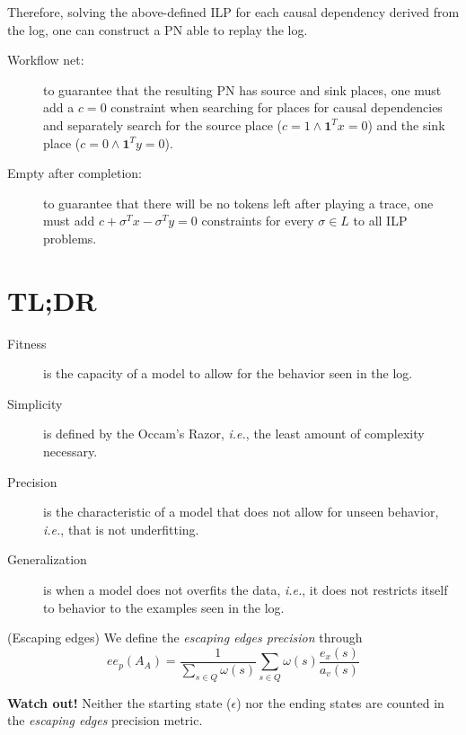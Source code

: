 \documentclass[a4paper]{report}
\begin{document}
Therefore, solving the above-defined ILP for each causal dependency derived from the log, one can construct a PN able to replay the log.

\begin{description}
    \item[Workflow net:] to guarantee that the resulting PN has source and sink places, one must add a $c=0$ constraint when searching for places for causal dependencies and separately search for the source place ($c=1 \land \bm{1}^{T}x=0$) and the sink place ($c=0 \land \bm{1}^{T}y=0$).
    \item[Empty after completion:] to guarantee that there will be no tokens left after playing a trace, one must add $c+\sigma^{T}x - \sigma^{T}y=0$ constraints for every $\sigma \in L$ to all ILP problems.
\end{description}

\section*{TL;DR}

\begin{description}
    \item[Fitness] is the capacity of a model to allow for the behavior seen in the log.
    \item[Simplicity] is defined by the Occam's Razor, \emph{i.e.}, the least amount of complexity necessary.
    \item[Precision] is the characteristic of a model that does not allow for unseen behavior, \emph{i.e.}, that is not underfitting.
    \item[Generalization] is when a model does not overfits the data, \emph{i.e.}, it does not restricts itself to behavior to the examples seen in the log.
\end{description}

\begin{definition}
    (Escaping edges) We define the \emph{escaping edges precision} through \[
    ee_p(A_A) = \frac{1}{\sum_{s \in Q} \omega(s)}\sum_{s \in Q} \omega(s) \frac{e_x(s)}{a_v(s)}
    \] 
\end{definition}

\begin{note}
    \textbf{Watch out!} Neither the starting state ($\epsilon$) nor the ending states are counted in the \emph{escaping edges} precision metric.
\end{note}
\end{document}
